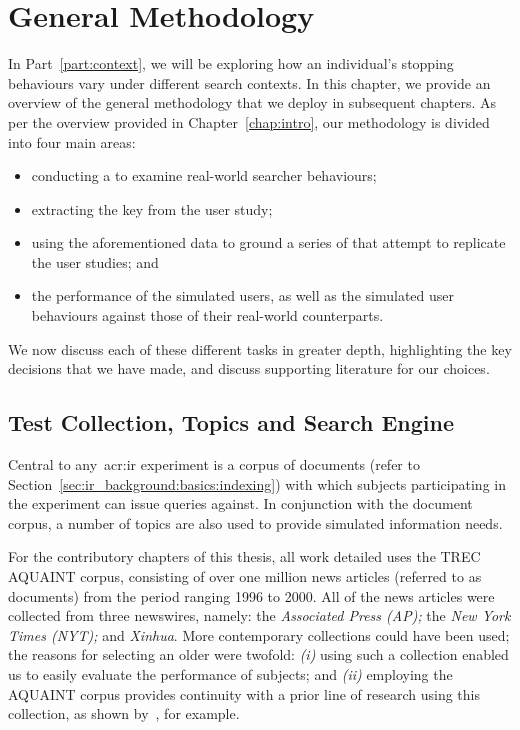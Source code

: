 
\chapter[General Methodology]{General Methodology}\label{chap:method}
In Part~\ref{part:context}, we will be exploring how an individual's stopping behaviours vary under different search contexts. In this chapter, we provide an overview of the general methodology that we deploy in subsequent chapters. As per the overview provided in Chapter~\ref{chap:intro}, our methodology is divided into four main areas:

\begin{itemize}
    \item{conducting a  to examine real-world searcher behaviours;}
    \item{extracting the key  from the user study;}
    \item{using the aforementioned data to ground a series of  that attempt to replicate the user studies; and}
    \item{ the performance of the simulated users, as well as  the simulated user behaviours against those of their real-world counterparts.}
\end{itemize}

We now discuss each of these different tasks in greater depth, highlighting the key decisions that we have made, and discuss supporting literature for our choices.

\section{Test Collection, Topics and Search Engine}\label{sec:csm:methodology:collection}
Central to any~\gls{acr:ir} experiment is a corpus of documents (refer to Section~\ref{sec:ir_background:basics:indexing}) with which subjects participating in the experiment can issue queries against. In conjunction with the document corpus, a number of topics are also used to provide simulated information needs.

For the contributory chapters of this thesis, all work detailed uses the TREC AQUAINT corpus, consisting of over one million news articles (referred to as documents) from the period ranging 1996 to 2000. All of the news articles were collected from three newswires, namely: the \emph{Associated Press (AP);} the \emph{New York Times (NYT);} and \emph{Xinhua}. More contemporary collections could have been used; the reasons for selecting an older were twofold: \emph{(i)} using such a collection enabled us to easily evaluate the performance of subjects; and \emph{(ii)} employing the AQUAINT corpus provides continuity with a prior line of research using this collection, as shown by~\cite{azzopardi2013query_cost}, for example.

